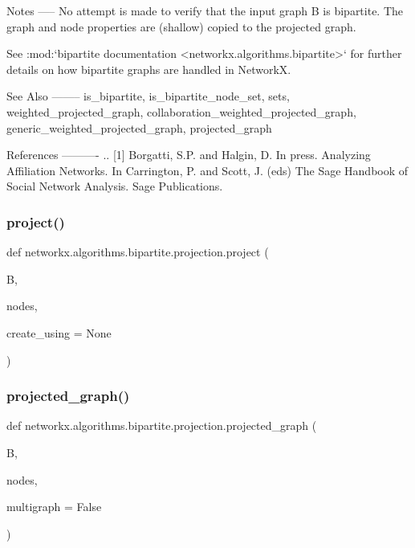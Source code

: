 \begin{DoxyVerb}
Notes
-----
No attempt is made to verify that the input graph B is bipartite.
The graph and node properties are (shallow) copied to the projected graph.

See :mod:`bipartite documentation <networkx.algorithms.bipartite>`
for further details on how bipartite graphs are handled in NetworkX.

See Also
--------
is_bipartite,
is_bipartite_node_set,
sets,
weighted_projected_graph,
collaboration_weighted_projected_graph,
generic_weighted_projected_graph,
projected_graph

References
----------
.. [1] Borgatti, S.P. and Halgin, D. In press. Analyzing Affiliation
    Networks. In Carrington, P. and Scott, J. (eds) The Sage Handbook
    of Social Network Analysis. Sage Publications.\end{DoxyVerb}
 \mbox{\label{namespacenetworkx_1_1algorithms_1_1bipartite_1_1projection_aaabf2d1a051d388c83a9b663b9daea87}} 
\subsubsection{\texorpdfstring{project()}{project()}}
{\footnotesize\ttfamily def networkx.\+algorithms.\+bipartite.\+projection.\+project (\begin{DoxyParamCaption}\item[{}]{B,  }\item[{}]{nodes,  }\item[{}]{create\+\_\+using = {\ttfamily None} }\end{DoxyParamCaption})}

\mbox{\label{namespacenetworkx_1_1algorithms_1_1bipartite_1_1projection_a25fdb8f9485964086be0bd888ce2e889}} 
\subsubsection{\texorpdfstring{projected\+\_\+graph()}{projected\_graph()}}
{\footnotesize\ttfamily def networkx.\+algorithms.\+bipartite.\+projection.\+projected\+\_\+graph (\begin{DoxyParamCaption}\item[{}]{B,  }\item[{}]{nodes,  }\item[{}]{multigraph = {\ttfamily False} }\end{DoxyParamCaption})}

